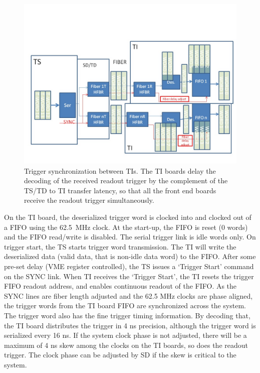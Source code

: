 \begin{figure}[hbt]
	\centering
	\includegraphics[width=1.0\columnwidth,keepaspectratio]{img/TrgSync.jpg}
	\caption{Trigger synchronization between TIs.  The TI boards delay the decoding of the received readout trigger by the complement of the TS/TD to TI transfer latency, so that all the front end boards receive the readout trigger simultaneously.}
	\label{fig:TIsync}
\end{figure}

On the TI board, the deserialized trigger word is clocked into and clocked out of a FIFO using the 62.5~MHz clock.  At the start-up, the FIFO is reset (0 words) and the FIFO read/write is disabled.  The serial trigger link is idle words only.  On trigger start, the TS starts trigger word transmission.  The TI will write the deserialized data (valid data, that is non-idle data word) to the FIFO.  After some pre-set delay (VME register controlled), the TS issues a ‘Trigger Start’ command on the SYNC link.  When TI receives the ‘Trigger Start’, the TI resets the trigger FIFO readout address, and enables continuous readout of the FIFO.  As the SYNC lines are fiber length adjusted and the 62.5 MHz clocks are phase aligned, the trigger words from the TI board FIFO are synchronized across the system.
The trigger word also has the fine trigger timing information.  By decoding that, the TI board distributes the trigger in 4 ns precision, although the trigger word is serialized every 16 ns.  If the system clock phase is not adjusted, there will be a maximum of 4 ns skew among the clocks on the TI boards, so does the readout trigger.  The clock phase can be adjusted by SD if the skew is critical to the system.


